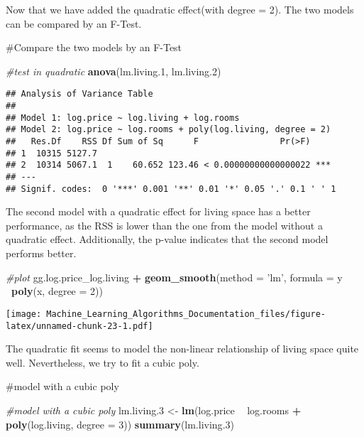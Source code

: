 \documentclass[
]{article}
\newenvironment{Shaded}{\begin{snugshade}}{\end{snugshade}}
\newcommand{\CommentTok}[1]{\textcolor[rgb]{0.56,0.35,0.01}{\textit{#1}}}
\newcommand{\DataTypeTok}[1]{\textcolor[rgb]{0.13,0.29,0.53}{#1}}
\newcommand{\DecValTok}[1]{\textcolor[rgb]{0.00,0.00,0.81}{#1}}
\newcommand{\FloatTok}[1]{\textcolor[rgb]{0.00,0.00,0.81}{#1}}
\newcommand{\KeywordTok}[1]{\textcolor[rgb]{0.13,0.29,0.53}{\textbf{#1}}}
\newcommand{\NormalTok}[1]{#1}
\newcommand{\OperatorTok}[1]{\textcolor[rgb]{0.81,0.36,0.00}{\textbf{#1}}}
\newcommand{\StringTok}[1]{\textcolor[rgb]{0.31,0.60,0.02}{#1}}
\begin{document}
Now that we have added the quadratic effect(with degree = 2). The two
models can be compared by an F-Test.

\#Compare the two models by an F-Test

\begin{Shaded}
\begin{Highlighting}[]
\CommentTok{#test in quadratic}
\KeywordTok{anova}\NormalTok{(lm.living}\FloatTok{.1}\NormalTok{, lm.living}\FloatTok{.2}\NormalTok{)}
\end{Highlighting}
\end{Shaded}

\begin{verbatim}
## Analysis of Variance Table
## 
## Model 1: log.price ~ log.living + log.rooms
## Model 2: log.price ~ log.rooms + poly(log.living, degree = 2)
##   Res.Df    RSS Df Sum of Sq      F                Pr(>F)    
## 1  10315 5127.7                                              
## 2  10314 5067.1  1    60.652 123.46 < 0.00000000000000022 ***
## ---
## Signif. codes:  0 '***' 0.001 '**' 0.01 '*' 0.05 '.' 0.1 ' ' 1
\end{verbatim}

The second model with a quadratic effect for living space has a better
performance, as the RSS is lower than the one from the model without a
quadratic effect. Additionally, the p-value indicates that the second
model performs better.

\begin{Shaded}
\begin{Highlighting}[]
\CommentTok{#plot}
\NormalTok{gg.log.price_log.living }\OperatorTok{+}\StringTok{ }\KeywordTok{geom_smooth}\NormalTok{(}\DataTypeTok{method =} \StringTok{'lm'}\NormalTok{, }\DataTypeTok{formula =}\NormalTok{ y }\OperatorTok{~}\KeywordTok{poly}\NormalTok{(x, }\DataTypeTok{degree =} \DecValTok{2}\NormalTok{))}
\end{Highlighting}
\end{Shaded}

\texttt{[image: Machine\_Learning\_Algorithms\_Documentation\_files/figure-latex/unnamed-chunk-23-1.pdf]}

The quadratic fit seems to model the non-linear relationship of living
space quite well. Nevertheless, we try to fit a cubic poly.

\#model with a cubic poly

\begin{Shaded}
\begin{Highlighting}[]
\CommentTok{#model with a cubic poly}
\NormalTok{lm.living}\FloatTok{.3}\NormalTok{ <-}\StringTok{ }\KeywordTok{lm}\NormalTok{(log.price }\OperatorTok{~}\StringTok{ }\NormalTok{log.rooms }\OperatorTok{+}\StringTok{ }\KeywordTok{poly}\NormalTok{(log.living, }\DataTypeTok{degree =} \DecValTok{3}\NormalTok{))}
\KeywordTok{summary}\NormalTok{(lm.living}\FloatTok{.3}\NormalTok{)}
\end{Highlighting}
\end{Shaded}
\end{document}
